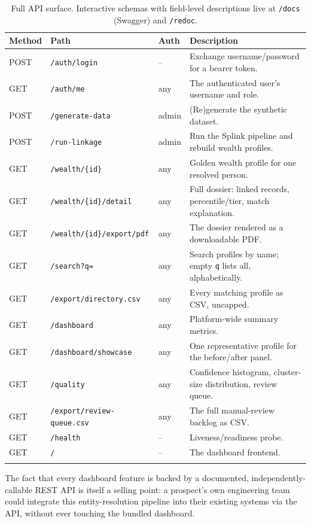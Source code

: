 \documentclass[11pt]{report}
\begin{document}
{\small
\begin{longtable}{@{}p{1.3cm}p{4.6cm}p{1.3cm}p{5.9cm}@{}}
\toprule
\textbf{Method} & \textbf{Path} & \textbf{Auth} & \textbf{Description} \\
\midrule
\endhead
POST & \texttt{/auth/login} & -- & Exchange username/password for a bearer token. \\
GET & \texttt{/auth/me} & any & The authenticated user's username and role. \\
POST & \texttt{/generate-data} & admin & (Re)generate the synthetic dataset. \\
POST & \texttt{/run-linkage} & admin & Run the Splink pipeline and rebuild wealth profiles. \\
GET & \texttt{/wealth/\{id\}} & any & Golden wealth profile for one resolved person. \\
GET & \texttt{/wealth/\{id\}/detail} & any & Full dossier: linked records, percentile/tier, match explanation. \\
GET & \texttt{/wealth/\{id\}/export/pdf} & any & The dossier rendered as a downloadable PDF. \\
GET & \texttt{/search?q=} & any & Search profiles by name; empty \texttt{q} lists all, alphabetically. \\
GET & \texttt{/export/directory.csv} & any & Every matching profile as CSV, uncapped. \\
GET & \texttt{/dashboard} & any & Platform-wide summary metrics. \\
GET & \texttt{/dashboard/showcase} & any & One representative profile for the before/after panel. \\
GET & \texttt{/quality} & any & Confidence histogram, cluster-size distribution, review queue. \\
GET & \texttt{/export/review-queue.csv} & any & The full manual-review backlog as CSV. \\
GET & \texttt{/health} & -- & Liveness/readiness probe. \\
GET & \texttt{/} & -- & The dashboard frontend. \\
\bottomrule
\caption{Full API surface. Interactive schemas with field-level descriptions live at \texttt{/docs} (Swagger) and \texttt{/redoc}.}
\end{longtable}
}

\begin{bizbox}
The fact that every dashboard feature is backed by a documented, independently-callable REST API is itself a selling point: a prospect's own engineering team could integrate this entity-resolution pipeline into their existing systems via the API, without ever touching the bundled dashboard.
\end{bizbox}
\end{document}
